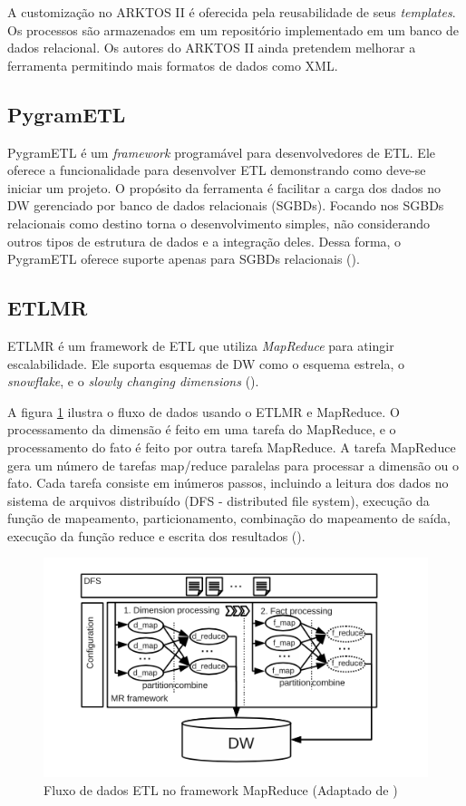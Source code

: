 A customização no ARKTOS II é oferecida pela reusabilidade de seus \textit{templates}. Os processos são armazenados em um repositório implementado em um banco de dados relacional. Os autores do ARKTOS II ainda pretendem melhorar a ferramenta permitindo mais formatos de dados como XML.


\subsection{PygramETL}

PygramETL é um \textit{framework} programável para desenvolvedores de ETL. Ele oferece a funcionalidade para desenvolver ETL demonstrando como deve-se iniciar um projeto. O propósito da ferramenta é facilitar a carga dos dados no DW gerenciado por banco de dados relacionais (SGBDs). Focando nos SGBDs relacionais como destino torna o desenvolvimento simples, não considerando outros tipos de estrutura de dados e a integração deles. Dessa forma, o PygramETL oferece suporte apenas para SGBDs relacionais (\cite{thomsen:2009}).

\subsection{ETLMR}

ETLMR é um framework de ETL que utiliza \textit{MapReduce} para atingir escalabilidade. Ele suporta esquemas de DW como o esquema estrela, o \textit{snowflake}, e o \textit{slowly changing dimensions} (\cite{liu:2011}). 

A figura \ref{etlmr} ilustra o fluxo de dados usando o ETLMR e MapReduce. O processamento da dimensão é feito em uma tarefa do MapReduce, e o processamento do fato é feito por outra tarefa MapReduce. A tarefa MapReduce gera um número de tarefas map/reduce paralelas para processar a dimensão ou o fato. Cada tarefa consiste em inúmeros passos, incluindo a leitura dos dados no sistema de arquivos distribuído (DFS - distributed file system), execução da função de mapeamento, particionamento, combinação do mapeamento de saída, execução da função reduce e escrita dos resultados (\cite{liu:2011}).

\begin{figure}
	\centering
	\includegraphics[scale=0.9]{fig/etlmr.png}
	\caption{Fluxo de dados ETL no framework MapReduce (Adaptado de \cite{liu:2011})}
	\label{etlmr}
\end{figure}

